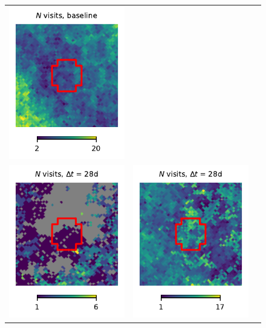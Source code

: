 \documentclass[preprintm,linenumbers]{aastex631}
\begin{document}
\begin{figure}
\begin{tabular}{  c c c}
				\includegraphics{results/skymaps_cutout/skymaps_cutout_first_year_one_snap_v4_0_10yrs_db_noDD_noTwi_nside-256_CountMetric_r_GP_noDD_noTwi.pdf} \\
				\includegraphics{results/skymaps_cutout/skymaps_cutout_first_year_one_snap_v4_0_10yrs_db_noDD_noTwi_tscale-28_nside-256_doAllTemplateMetrics_reduceCount_r_NES_noDD_noTwi.pdf} &
				\includegraphics{results/skymaps_cutout/skymaps_cutout_first_year_one_snap_v4_0_10yrs_db_noDD_noTwi_tscale-28_nside-256_doAllTemplateMetrics_reduceCount_r_WFD_noDD_noTwi.pdf} &

\end{tabular}
\end{figure}
\end{document}
